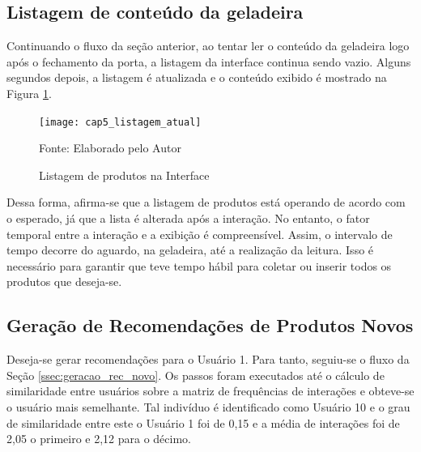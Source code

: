 \subsection{Listagem de conteúdo da geladeira}
 
Continuando o fluxo da seção anterior, ao tentar ler o conteúdo da geladeira logo após o fechamento da porta, a listagem da interface continua sendo vazio. Alguns segundos depois, a listagem é atualizada e o conteúdo exibido é mostrado na Figura \ref{fig:cap5_listagem_atual}.


\begin{figure}[htb]
    \caption{Listagem de produtos na Interface}
    \label{fig:cap5_listagem_atual}
    \texttt{[image: cap5\_listagem\_atual]}
    
    \footnotesize{Fonte: Elaborado pelo Autor}
\end{figure}
 
Dessa forma, afirma-se que a listagem de produtos está operando de acordo com o esperado, já que a lista é alterada após a interação. No entanto, o fator temporal entre a interação e a exibição é compreensível. Assim, o intervalo de tempo decorre do aguardo, na geladeira, até a realização da leitura. Isso é necessário para garantir que teve tempo hábil para coletar ou inserir todos os produtos que deseja-se.


\subsection{Geração de Recomendações de Produtos Novos}

Deseja-se gerar recomendações para o Usuário 1. Para tanto, seguiu-se o fluxo da Seção \ref{ssec:geracao_rec_novo}. Os passos foram executados até o cálculo de similaridade entre usuários sobre a matriz de frequências de interações e obteve-se o usuário mais semelhante. Tal indivíduo é identificado como Usuário 10 e o grau de similaridade entre este o Usuário 1 foi de 0,15 e a média de interações foi de 2,05 o primeiro e 2,12 para o décimo.


